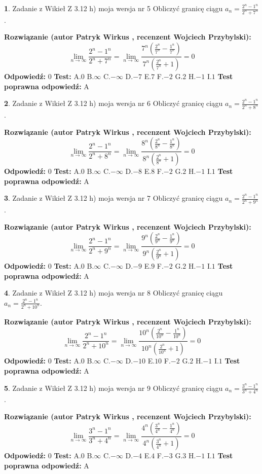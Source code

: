 \documentclass[12pt, a4paper]{article}
\theoremstyle{definition} %
\newtheorem{zad}{}
\newcommand{\zadStart}[1]{\begin{zad}#1\newline}
\newcommand{\zadStop}{\end{zad}}
\newcommand{\rozwStart}[2]{\noindent \textbf{Rozwiązanie (autor #1 , recenzent #2): }\newline}
\newcommand{\rozwStop}{\newline}
\newcommand{\odpStart}{\noindent \textbf{Odpowiedź:}\newline}
\newcommand{\odpStop}{\newline}
\newcommand{\testStart}{\noindent \textbf{Test:}\newline}
\newcommand{\testStop}{\newline}
\newcommand{\kluczStart}{\noindent \textbf{Test poprawna odpowiedź:}\newline}
\newcommand{\kluczStop}{\newline}
\begin{document}
\zadStart{Zadanie z Wikieł Z 3.12 h) moja wersja nr 5}
Obliczyć granicę ciągu $a_{n}=\frac{2^{n} - 1^{n}}{2^{n} + 7^{n}}$.
\zadStop
\rozwStart{Patryk Wirkus}{Wojciech Przybylski}
$$\lim\limits_{n\to\infty}\frac{2^{n} - 1^{n}}{2^{n} + 7^{n}} = \lim\limits_{n\to\infty}\frac{7^{n}(\frac{2^{n}}{7^{n}} - \frac{1^{n}}{7^{n}})}{7^{n}(\frac{2^{n}}{7^{n}} + 1)} = 0$$
\rozwStop
\odpStart
$0$
\odpStop
\testStart
A.$0$
B.$\infty$
C.$-\infty$
D.$-7$
E.$7$
F.$-2$
G.$2$
H.$-1$
I.$1$
\testStop
\kluczStart
A
\kluczStop



\zadStart{Zadanie z Wikieł Z 3.12 h) moja wersja nr 6}
Obliczyć granicę ciągu $a_{n}=\frac{2^{n} - 1^{n}}{2^{n} + 8^{n}}$.
\zadStop
\rozwStart{Patryk Wirkus}{Wojciech Przybylski}
$$\lim\limits_{n\to\infty}\frac{2^{n} - 1^{n}}{2^{n} + 8^{n}} = \lim\limits_{n\to\infty}\frac{8^{n}(\frac{2^{n}}{8^{n}} - \frac{1^{n}}{8^{n}})}{8^{n}(\frac{2^{n}}{8^{n}} + 1)} = 0$$
\rozwStop
\odpStart
$0$
\odpStop
\testStart
A.$0$
B.$\infty$
C.$-\infty$
D.$-8$
E.$8$
F.$-2$
G.$2$
H.$-1$
I.$1$
\testStop
\kluczStart
A
\kluczStop



\zadStart{Zadanie z Wikieł Z 3.12 h) moja wersja nr 7}
Obliczyć granicę ciągu $a_{n}=\frac{2^{n} - 1^{n}}{2^{n} + 9^{n}}$.
\zadStop
\rozwStart{Patryk Wirkus}{Wojciech Przybylski}
$$\lim\limits_{n\to\infty}\frac{2^{n} - 1^{n}}{2^{n} + 9^{n}} = \lim\limits_{n\to\infty}\frac{9^{n}(\frac{2^{n}}{9^{n}} - \frac{1^{n}}{9^{n}})}{9^{n}(\frac{2^{n}}{9^{n}} + 1)} = 0$$
\rozwStop
\odpStart
$0$
\odpStop
\testStart
A.$0$
B.$\infty$
C.$-\infty$
D.$-9$
E.$9$
F.$-2$
G.$2$
H.$-1$
I.$1$
\testStop
\kluczStart
A
\kluczStop



\zadStart{Zadanie z Wikieł Z 3.12 h) moja wersja nr 8}
Obliczyć granicę ciągu $a_{n}=\frac{2^{n} - 1^{n}}{2^{n} + 10^{n}}$.
\zadStop
\rozwStart{Patryk Wirkus}{Wojciech Przybylski}
$$\lim\limits_{n\to\infty}\frac{2^{n} - 1^{n}}{2^{n} + 10^{n}} = \lim\limits_{n\to\infty}\frac{10^{n}(\frac{2^{n}}{10^{n}} - \frac{1^{n}}{10^{n}})}{10^{n}(\frac{2^{n}}{10^{n}} + 1)} = 0$$
\rozwStop
\odpStart
$0$
\odpStop
\testStart
A.$0$
B.$\infty$
C.$-\infty$
D.$-10$
E.$10$
F.$-2$
G.$2$
H.$-1$
I.$1$
\testStop
\kluczStart
A
\kluczStop



\zadStart{Zadanie z Wikieł Z 3.12 h) moja wersja nr 9}
Obliczyć granicę ciągu $a_{n}=\frac{3^{n} - 1^{n}}{3^{n} + 4^{n}}$.
\zadStop
\rozwStart{Patryk Wirkus}{Wojciech Przybylski}
$$\lim\limits_{n\to\infty}\frac{3^{n} - 1^{n}}{3^{n} + 4^{n}} = \lim\limits_{n\to\infty}\frac{4^{n}(\frac{3^{n}}{4^{n}} - \frac{1^{n}}{4^{n}})}{4^{n}(\frac{3^{n}}{4^{n}} + 1)} = 0$$
\rozwStop
\odpStart
$0$
\odpStop
\testStart
A.$0$
B.$\infty$
C.$-\infty$
D.$-4$
E.$4$
F.$-3$
G.$3$
H.$-1$
I.$1$
\testStop
\kluczStart
A
\kluczStop
\end{document}
